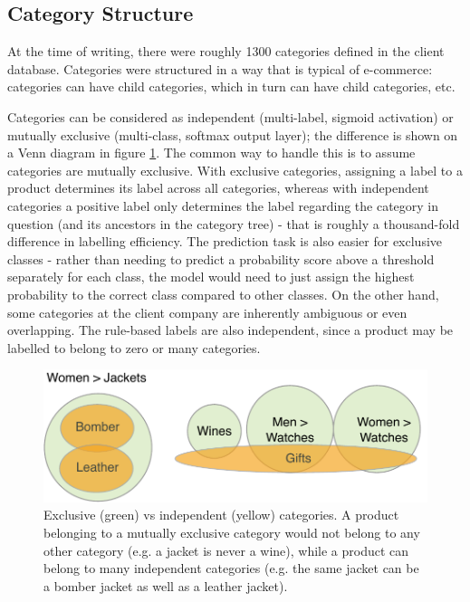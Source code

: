 \subsection{Category Structure}
\label{cat_tree}

At the time of writing, there were roughly 1300 categories defined in the client database.
Categories were structured in a way that is typical of  e-commerce:  categories can have  child categories, which in turn can have child categories, etc.

Categories can be considered as independent (multi-label, sigmoid activation) or mutually exclusive (multi-class, softmax output layer); the difference is shown on a Venn diagram in figure \ref{excl_ind}.
The common way to handle this is to assume categories are mutually exclusive.
With exclusive categories, assigning a label to a product determines its label across all categories, whereas with independent categories a positive label only determines the label regarding the category in question (and its ancestors in the category tree) - that is roughly a thousand-fold difference in labelling efficiency.
The prediction task is also easier for exclusive classes - rather than needing to predict a probability score above a threshold separately for each class, the model would need to just assign the highest probability to the correct class compared to other classes.
On the other hand, some categories at the client company are inherently ambiguous or even overlapping.
The rule-based labels are also independent, since a product may be labelled to belong to zero or many categories.

\begin{figure}
  \centering
  \includegraphics[width=0.6\linewidth]{figures/slides/excl_ind}
  \caption{Exclusive (green) vs independent (yellow) categories. A product belonging to a mutually exclusive category would not belong to any other category (e.g. a jacket is never a wine), while a product can belong to many independent categories (e.g. the same jacket can be a bomber jacket as well as a leather jacket). }
  \label{excl_ind}
\end{figure}

